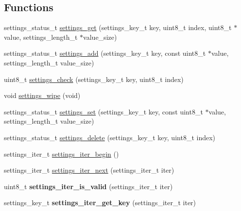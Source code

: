 \subsection*{Functions}
\begin{DoxyCompactItemize}
\item 
settings\+\_\+status\+\_\+t \hyperlink{group__settings__lib_ga9a53effce56b81ff281e0a74bd8dc24a}{settings\+\_\+get} (settings\+\_\+key\+\_\+t key, uint8\+\_\+t index, uint8\+\_\+t $\ast$value, settings\+\_\+length\+\_\+t $\ast$value\+\_\+size)
\item 
settings\+\_\+status\+\_\+t \hyperlink{group__settings__lib_ga2b3f6cdf635874d3fc376b8db5ee3441}{settings\+\_\+add} (settings\+\_\+key\+\_\+t key, const uint8\+\_\+t $\ast$value, settings\+\_\+length\+\_\+t value\+\_\+size)
\item 
uint8\+\_\+t \hyperlink{group__settings__lib_ga84250b2939b9b11089a20f35bf2339a6}{settings\+\_\+check} (settings\+\_\+key\+\_\+t key, uint8\+\_\+t index)
\item 
void \hyperlink{group__settings__lib_ga706295b937c4e89f45b4d3a378c5a310}{settings\+\_\+wipe} (void)
\item 
settings\+\_\+status\+\_\+t \hyperlink{group__settings__lib_gad555a662030f3ed1f3c815d6643bf552}{settings\+\_\+set} (settings\+\_\+key\+\_\+t key, const uint8\+\_\+t $\ast$value, settings\+\_\+length\+\_\+t value\+\_\+size)
\item 
settings\+\_\+status\+\_\+t \hyperlink{group__settings__lib_ga9401ab649c773afd42671b41d6e0921b}{settings\+\_\+delete} (settings\+\_\+key\+\_\+t key, uint8\+\_\+t index)
\item 
settings\+\_\+iter\+\_\+t \hyperlink{group__settings__lib_ga09464b27f0bc78e22c7ff0d57341e2cd}{settings\+\_\+iter\+\_\+begin} ()
\item 
settings\+\_\+iter\+\_\+t \hyperlink{group__settings__lib_ga921d2c5da8290b03d0ecff99d36ccb15}{settings\+\_\+iter\+\_\+next} (settings\+\_\+iter\+\_\+t iter)
\item 
\hypertarget{group__settings__lib_ga84809d2206ac378b59ad4cb879c407b7}{}uint8\+\_\+t {\bfseries settings\+\_\+iter\+\_\+is\+\_\+valid} (settings\+\_\+iter\+\_\+t iter)\label{group__settings__lib_ga84809d2206ac378b59ad4cb879c407b7}

\item 
\hypertarget{group__settings__lib_ga478ca6f0ca2ee16295b551c93cb0ebd2}{}settings\+\_\+key\+\_\+t {\bfseries settings\+\_\+iter\+\_\+get\+\_\+key} (settings\+\_\+iter\+\_\+t iter)\label{group__settings__lib_ga478ca6f0ca2ee16295b551c93cb0ebd2}


\end{DoxyCompactItemize}
